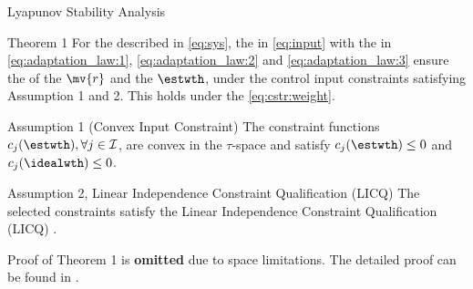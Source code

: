 \documentclass[8pt, aspectratio=169]{beamer}
\newcommand{\ctxt}[2]{\color{#1}{#2}\color{black}}
\begin{document}
\begin{frame}{\insertsubsectionhead}{Lyapunov Stability Analysis}

  \centering
  \begin{minipage}{.9\textwidth}

    \begin{block}{Theorem 1 \cite{Ryu:2025aa}}
      For the \ctxt{airforceblue}{dynamical system } described in \eqref{eq:sys}, the \ctxt{awesome}{neuro-adaptive controller } in \eqref{eq:input} with the \ctxt{airforceblue}{weight adaptation laws } in \eqref{eq:adaptation_law:1}, \eqref{eq:adaptation_law:2} and \eqref{eq:adaptation_law:3} ensure the \ctxt{airforceblue}{boundedness } of the \ctxt{awesome}{filtered error } $\mv{r}$ and the \ctxt{awesome}{weight estimate } $\estwth$, under the control input constraints satisfying Assumption 1 and 2. This holds under the \ctxt{awesome}{weight norm constraint } \eqref{eq:cstr:weight}.
    \end{block}

    \begin{exampleblock}{Assumption 1 (Convex Input Constraint)}
      The constraint functions $c_j(\estwth),\forall j\in\mathcal{I}$, are convex in the $\tau$-space and satisfy $c_j(\estwth)\le0$ and $c_j(\idealwth)\le0$.
    \end{exampleblock}

    \begin{exampleblock}{Assumption 2, Linear Independence Constraint Qualification (LICQ)}
      The selected constraints satisfy the Linear Independence Constraint Qualification (LICQ) \cite[Chap. 12 Def. 12.1]{Nocedal:2006aa}.
    \end{exampleblock}

  \end{minipage}

  \vspace{.2cm}

  Proof of Theorem 1 is \textbf{omitted } due to space limitations. The detailed proof can be found in \cite{Ryu:2025aa}.

\end{frame}

\end{document}
